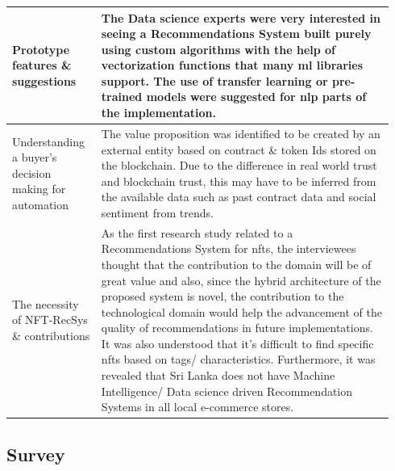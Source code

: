 \begin{longtable}{|p{0.22\linewidth}|p{0.72\linewidth}|}
\hline
Prototype features \& suggestions & The Data science experts were very interested in seeing a Recommendations System built purely using custom algorithms with the help of vectorization functions that many \gls{ml} libraries support. The use of transfer learning or pre-trained models were suggested for \gls{nlp} parts of the implementation.\\ 
\hline
Understanding a buyer's decision making for automation & The value proposition was identified to be created by an external entity based on contract \& token Ids stored on the blockchain. Due to the difference in real world trust and blockchain trust, this may have to be inferred from the available data such as past contract data and social sentiment from trends. \\ 
\hline
The necessity of NFT-RecSys \& contributions & As the first research study related to a Recommendations System for \gls{nft}s, the interviewees thought that the contribution to the domain will be of great value and also, since the hybrid architecture of the proposed system is novel, the contribution to the technological domain would help the advancement of the quality of recommendations in future implementations. It was also understood that it's difficult to find specific \gls{nft}s based on tags/ characteristics.
Furthermore, it was revealed that Sri Lanka does not have Machine Intelligence/ Data science driven Recommendation Systems in all local e-commerce stores.
\\ 
\hline

\end{longtable}

\pagebreak
\subsection{Survey}

